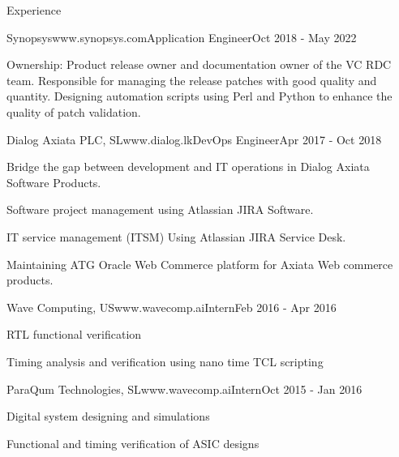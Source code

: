 \documentclass[
11pt, %
]{./assets/resume} %
\begin{document}
\begin{rSection}{Experience}
\begin{rSubsectionX}{Synopsys}{www.synopsys.com}{Application Engineer}{Oct 2018 - May 2022}
		\item Ownership: Product release owner and documentation owner of the VC RDC team. Responsible for managing the release patches with good quality and quantity. Designing automation scripts using Perl and Python to enhance the quality of patch validation.
	\end{rSubsectionX}
	\begin{rSubsectionX}{Dialog Axiata PLC, SL}{www.dialog.lk}{DevOps Engineer}{Apr 2017 - Oct 2018}
		\item Bridge the gap between development and IT operations in Dialog Axiata Software Products.
		\item Software project management using Atlassian JIRA Software.
		\item IT service management (ITSM) Using Atlassian JIRA Service Desk.
		\item Maintaining ATG Oracle Web Commerce platform for Axiata Web commerce products.
	\end{rSubsectionX}
	\begin{rSubsectionX}{Wave Computing, US}{www.wavecomp.ai}{Intern}{Feb 2016 - Apr 2016}
		\item RTL functional verification
		\item Timing analysis and verification using nano time TCL scripting
	\end{rSubsectionX}
	\begin{rSubsectionX}{ParaQum Technologies, SL}{www.wavecomp.ai}{Intern}{Oct 2015 - Jan 2016}
		\item Digital system designing and simulations
		\item Functional and timing verification of ASIC designs
	\end{rSubsectionX}

\end{rSection}

\end{document}
